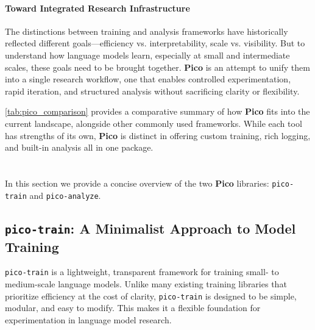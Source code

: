 
\paragraph{Toward Integrated Research Infrastructure}
The distinctions between training and analysis frameworks have historically reflected different goals—efficiency vs. interpretability, scale vs. visibility. But to understand how language models learn, especially at small and intermediate scales, these goals need to be brought together. \textbf{Pico} is an attempt to unify them into a single research workflow, one that enables controlled experimentation, rapid iteration, and structured analysis without sacrificing clarity or flexibility.

\cref{tab:pico_comparison} provides a comparative summary of how \textbf{Pico} fits into the current landscape, alongside other commonly used frameworks. While each tool has strengths of its own, \textbf{Pico} is distinct in offering custom training, rich logging, and built-in analysis all in one package.

\section[\picomed]{\picolarge}

In this section we provide a concise overview of the two \textbf{Pico} libraries: \texttt{pico-train} and \texttt{pico-analyze}. 

\subsection{\texttt{pico-train}: A Minimalist Approach to Model Training}

\texttt{pico-train} is a lightweight, transparent framework for training small- to medium-scale language models. Unlike many existing training libraries that prioritize efficiency at the cost of clarity, \texttt{pico-train} is designed to be simple, modular, and easy to modify. This makes it a flexible foundation for experimentation in language model research.

